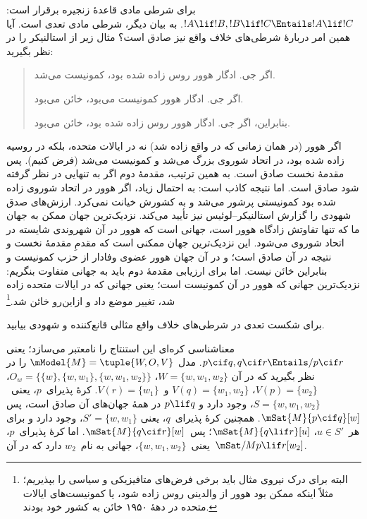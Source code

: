 \documentclass[../../../include/open-logic-section]{subfiles}
\begin{document}


برای شرطی مادی قاعدهٔ زنجیره برقرار است:
$!A \lif !B, !B \lif !C \Entails !A \lif !C$. به بیان دیگر، شرطی
مادی تعدی است. آیا همین امر دربارهٔ شرطی‌های خلاف واقع نیز صادق است؟
مثال زیر از استالنیکر را در نظر بگیرید:
\begin{quote}
  اگر جی. ادگار هوور روس زاده شده بود، کمونیست می‌شد.

  اگر جی. ادگار هوور کمونیست می‌بود، خائن می‌بود.

  بنابراین، اگر جی. ادگار هوور روس زاده شده بود، خائن می‌بود.
\end{quote}
اگر هوور (در همان زمانی که در واقع زاده شد) نه در ایالات متحده، بلکه
در روسیه زاده شده بود، در اتحاد شوروی بزرگ می‌شد و کمونیست می‌شد
(فرض کنیم). پس مقدمهٔ نخست صادق است. به همین ترتیب، مقدمهٔ دوم اگر به
تنهایی در نظر گرفته شود صادق است. اما نتیجه کاذب است: به احتمال زیاد،
اگر هوور در اتحاد شوروی زاده شده بود کمونیستی پرشور می‌شد و به کشورش
خیانت نمی‌کرد. ارزش‌های صدق شهودی را گزارش استالنیکر--لوئیس نیز تأیید
می‌کند. نزدیک‌ترین جهان ممکن به جهان ما که تنها تفاوتش زادگاه هوور است،
جهانی است که هوور در آن شهروندی شایسته در اتحاد شوروی می‌شود. این
نزدیک‌ترین جهان ممکنی است که مقدمِ مقدمهٔ نخست و نتیجه در آن صادق است؛
و در آن جهان هوور عضوی وفادار از حزب کمونیست و بنابراین خائن نیست. اما
برای ارزیابی مقدمهٔ دوم باید به جهانی متفاوت بنگریم: نزدیک‌ترین جهانی
که هوور در آن کمونیست است؛ یعنی جهانی که در ایالات متحده زاده شد، تغییر
موضع داد و ازاین‌رو خائن شد.\footnote{البته برای درک نیروی مثال باید
  برخی فرض‌های متافیزیکی و سیاسی را بپذیریم؛ مثلاً اینکه ممکن بود هوور
  از والدینی روس زاده شود، یا کمونیست‌های ایالات متحده در دههٔ ۱۹۵۰
  خائن به کشور خود بودند.}

\begin{prob}
  برای شکست تعدی در شرطی‌های خلاف واقع مثالی قانع‌کننده و شهودی بیابید.
\end{prob}

\begin{ex}
  معناشناسی کره‌ای این استنتاج را نامعتبر می‌سازد؛ یعنی
  $p \cif q, q \cif r \Entails/ p \cif r$. مدل
  $\mModel{M} = \tuple{W, O, V}$ را در نظر بگیرید که در آن
  $W = \{w, w_1, w_2\}$،
  $O_w = \{\{w\}, \{w, w_1\}, \{w, w_1, w_2\}\}$،
  $V(p) = \{w_2\}$، $V(q) = \{w_1, w_2\}$ و~$V(r) = \{w_1\}$.
  کرهٔ پذیرای~$p$، یعنی~$S = \{w, w_1, w_2\}$، وجود دارد و
  $p \lif q$ در همهٔ جهان‌های آن صادق است، پس
  $\mSat{M}{p \cif q}[w]$. همچنین کرهٔ پذیرای~$q$، یعنی
  $S' = \{w, w_1\}$، وجود دارد و برای هر~$u \in S'$،
  $\mSat{M}{q \lif r}[u]$؛ پس~$\mSat{M}{q \cif r}[w]$. اما کرهٔ
  پذیرای~$p$، یعنی~$\{w, w_1, w_2\}$، جهانی به نام~$w_2$ دارد که در
  آن~$\mSat/{M}{p \lif r}[w_2]$.
\end{ex}
\end{document}
